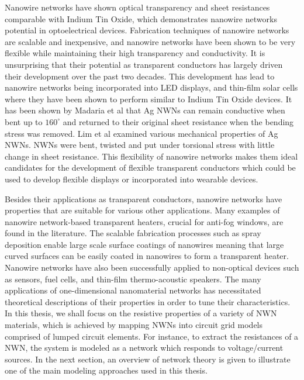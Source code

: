 Nanowire networks have shown optical transparency and sheet resistances comparable with Indium Tin Oxide\cite{lagrange2015,hsu2013,liangbing2010}, which demonstrates nanowire networks potential in optoelectrical devices. Fabrication techniques of nanowire networks are scalable and inexpensive, and nanowire networks have been shown to be very flexible while maintaining their high transparency and conductivity. It is unsurprising that their potential as transparent conductors has largely driven their development over the past two decades\cite{bellet2017,gong2017,langley2013}. This development has lead to nanowire networks being incorporated into LED displays\cite{zeng2010,yu2011}, and thin-film solar cells\cite{morgenstern2011,lan2013,song2013,dechan2015} where they have been shown to perform similar to Indium Tin Oxide devices. It has been shown by Madaria et al\cite{madaria2010} that Ag NWNs can remain conductive when bent up to $160^{\circ}$ and returned to their original sheet resistance when the bending stress was removed. Lim et al \cite{lim2012} examined various mechanical properties of Ag NWNs. NWNs were bent, twisted and put under torsional stress with little change in sheet resistance. This flexibility of nanowire networks makes them ideal candidates for the development of flexible transparent conductors which could be used to develop flexible displays or incorporated into wearable devices\cite{langley2013,gong2017}. 

Besides their applications as transparent conductors, nanowire networks have properties that are suitable for various other applications. Many examples of nanowire network-based transparent heaters, crucial for anti-fog windows, are found in the literature\cite{celle2012,sorel2014,ergun2016,bobinger2017}. The scalable fabrication processes such as spray deposition enable large scale surface coatings of nanowires meaning that large curved surfaces can be easily coated in nanowires to form a transparent heater. Nanowire networks have also been successfully applied to non-optical devices such as sensors\cite{takei2010,wang2015}, fuel cells\cite{chang2016,chang2014,chang2013}, and thin-film thermo-acoustic speakers\cite{la2017}. The many applications of one-dimensional nanomaterial networks has necessitated theoretical descriptions of their properties in order to tune their characteristics. In this thesis, we shall focus on the resistive properties of a variety of NWN materials, which is achieved by mapping NWNs into circuit grid models comprised of lumped circuit elements. For instance, to extract the resistances of a NWN, the system is modeled as a network which responds to voltage/current sources. In the next section, an overview of network theory is given to illustrate one of the main modeling approaches used in this thesis.

